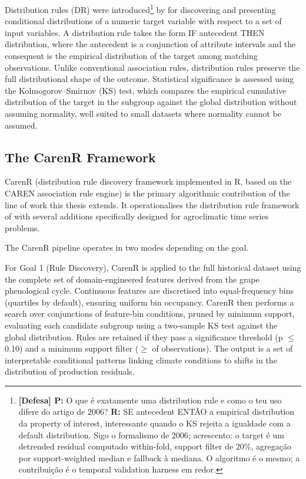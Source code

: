 Distribution rules (DR) were introduced\footnote{\textbf{[Defesa] P:} O que é exatamente uma distribution rule e como o teu uso difere do artigo de 2006? \textbf{R:} SE antecedent ENTÃO a empirical distribution da property of interest, interessante quando o KS rejeita a igualdade com a default distribution. Sigo o formalismo de 2006; acrescento: o target é um detrended residual computado within-fold, support filter de 20\%, agregação por support-weighted median e fallback à mediana. O algoritmo é o mesmo; a contribuição é o temporal validation harness em redor.} by \citet{Jorge2006} for discovering and presenting conditional distributions of a numeric target variable with respect to a set of input variables. A distribution rule takes the form IF antecedent THEN distribution, where the antecedent is a conjunction of attribute intervals and the consequent is the empirical distribution of the target among matching observations. Unlike conventional association rules, distribution rules preserve the full distributional shape of the outcome. Statistical significance is assessed using the Kolmogorov--Smirnov (KS) test, which compares the empirical cumulative distribution of the target in the subgroup against the global distribution without assuming normality, well suited to small datasets where normality cannot be assumed.


\subsection{The CarenR Framework}\label{sub:the_carenr_framework}

CarenR (distribution rule discovery framework implemented in R, based on the CAREN association rule engine) is the primary algorithmic contribution of the line of work this thesis extends. It operationalises the distribution rule framework of \citet{Jorge2006} with several additions specifically designed for agroclimatic time series problems.

The CarenR pipeline operates in two modes depending on the goal.

For Goal 1 (Rule Discovery), CarenR is applied to the full historical dataset using the complete set of domain-engineered features derived from the grape phenological cycle. Continuous features are discretised into equal-frequency bins (quartiles by default), ensuring uniform bin occupancy. CarenR then performs a  search over conjunctions of feature-bin conditions, pruned by minimum support, evaluating each candidate subgroup using a two-sample KS test against the global distribution. Rules are retained if they pass a significance threshold (p $\leq$ 0.10) and a minimum support filter ($\geq$  of observations). The output is a set of interpretable conditional patterns linking climate conditions to shifts in the distribution of production residuals.

